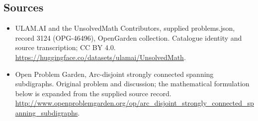 \documentclass[11pt,a4paper]{article}
\begin{document}
\subsection{Sources}
\begin{itemize}
\item[S1] ULAM.AI and the UnsolvedMath Contributors, supplied problems.json, record 3124 (OPG-46496), OpenGarden collection. Catalogue identity and source transcription; CC BY 4.0.
\url{https://huggingface.co/datasets/ulamai/UnsolvedMath}.
\item[S2] Open Problem Garden, Arc-disjoint strongly connected spanning subdigraphs. Original problem and discussion; the mathematical formulation below is expanded from the supplied source record.
\url{http://www.openproblemgarden.org/op/arc_disjoint_strongly_connected_spanning_subdigraphs}.

\end{itemize}
\end{document}

